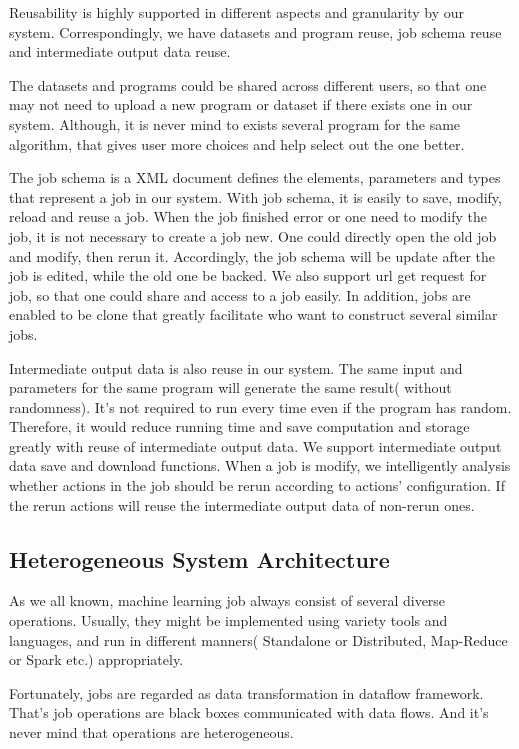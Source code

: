\documentclass{sig-alternate-05-2015}
\begin{document}
Reusability is highly supported in different aspects and granularity by our system.  Correspondingly, we have datasets and program reuse, job schema reuse and intermediate output data reuse.

The datasets and programs could be shared across different users, so that one may not need to upload a new program or dataset if there exists one in our system. Although, it is never mind to exists several program for the same algorithm, that gives user more choices and help select out the one better. 

The job schema is a XML document defines the elements, parameters and types that represent a job in our system. With job schema, it is easily to save, modify, reload and reuse a job. When the job finished error or one need to modify the job, it is not necessary to create a job new. One could directly open the old job and modify, then rerun it. Accordingly, the job schema will be update after the job is edited, while the old one be backed. We also support url get request for job, so that one could share and access to a job easily. In addition, jobs are enabled to be clone that greatly facilitate who want to construct several similar jobs.

Intermediate output data is also reuse in our system. The same input and parameters for the same program will generate the same result( without randomness). It's not required to run every time even if the program has random. Therefore, it would reduce running time and save computation and storage greatly with reuse of intermediate output data. We support intermediate output data save and download functions. When a job is modify, we intelligently analysis whether actions in the job should be rerun according to actions' configuration. If the rerun actions will reuse the intermediate output data of non-rerun ones.


\subsection{Heterogeneous System Architecture}

As we all known, machine learning job always consist of several diverse operations. Usually, they might be implemented using variety tools and languages, and run in different manners( Standalone or Distributed, Map-Reduce or Spark etc.) appropriately. 

Fortunately, jobs are regarded as data transformation in dataflow framework. That's job operations are black boxes communicated with data flows. And it's never mind that operations are heterogeneous.
\end{document}
